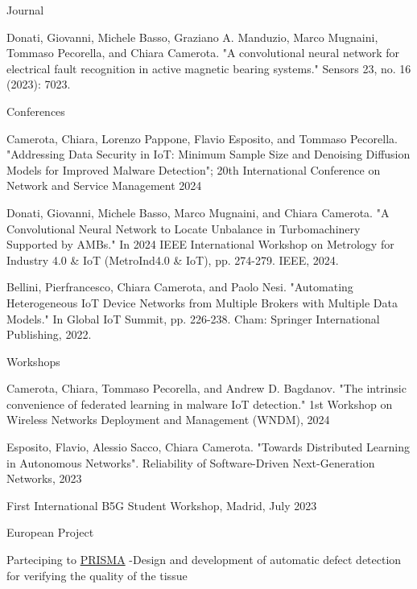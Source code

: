 \begin{cventries}
   \cventry
    {Journal}
    {}
    {}
    {}
    {
      \begin{cvitems}
        \item{Donati, Giovanni, Michele Basso, Graziano A. Manduzio, Marco Mugnaini, Tommaso Pecorella, and Chiara Camerota. "A convolutional neural network for electrical fault recognition in active magnetic bearing systems." Sensors 23, no. 16 (2023): 7023.}
      \end{cvitems}
    } 
   \cventry
    {Conferences}
    {}
    {}
    {}
    {
      \begin{cvitems}
        \item {Camerota, Chiara, Lorenzo Pappone, Flavio Esposito, and Tommaso Pecorella. "Addressing Data Security in IoT: Minimum Sample Size and Denoising Diffusion Models for Improved Malware Detection"; 20th International Conference on Network and Service Management 2024}
        \item{Donati, Giovanni, Michele Basso, Marco Mugnaini, and Chiara Camerota. "A Convolutional Neural Network to Locate Unbalance in Turbomachinery Supported by AMBs." In 2024 IEEE International Workshop on Metrology for Industry 4.0 \& IoT (MetroInd4.0 \& IoT), pp. 274-279. IEEE, 2024.}
        \item {Bellini, Pierfrancesco, Chiara Camerota, and Paolo Nesi. "Automating Heterogeneous IoT Device Networks from Multiple Brokers with Multiple Data Models." In Global IoT Summit, pp. 226-238. Cham: Springer International Publishing, 2022.}
      \end{cvitems}
    } 
   \cventry
    {Workshops}
    {}
    {}
    {}
    {
      \begin{cvitems}
        \item {Camerota, Chiara, Tommaso Pecorella, and Andrew D. Bagdanov. "The intrinsic convenience of federated learning in malware IoT detection." 1st Workshop on Wireless Networks Deployment and Management (WNDM), 2024}
        \item {Esposito, Flavio, Alessio Sacco, Chiara Camerota. "Towards Distributed Learning in Autonomous Networks". Reliability of Software-Driven Next-Generation Networks, 2023}
        \item{First International B5G Student Workshop, Madrid, July 2023}
      \end{cvitems}
    } 
     \cventry
    {European Project}
    {}
    {}
    {}
    {
      \begin{cvitems}
        \item{Parteciping to \href{https://www.net0prisma.eu/structure/}{PRISMA} -Design and development of automatic defect detection for verifying the quality of the tissue}
      \end{cvitems}
    } 
\end{cventries}